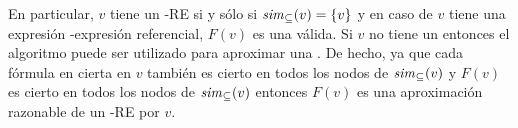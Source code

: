 %

En particular, $v$ tiene un \EL-RE si y s\'olo si ${\it sim}_\subseteq(v)=\{v\}$
y en caso de $v$ tiene una expresi\'on \EL-expresi\'on referencial, $F(v)$ es una v\'alida. Si $v$ no tiene un \posre entonces el algoritmo puede ser
utilizado para aproximar una \posre. De hecho, ya que cada f\'ormula en cierta en $v$
tambi\'en es cierto en todos los nodos de ${\it sim}_\subseteq(v)$ y $F(v)$
es cierto en todos los nodos de ${\it sim}_\subseteq(v)$ entonces $F(v)$ es una
aproximaci\'on razonable de un \EL-RE por $v$.

